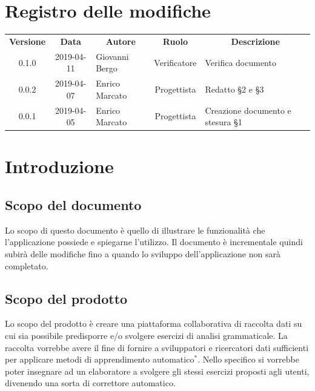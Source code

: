 \documentclass[11pt,a4paper]{article}
\begin{document}
	
	
	{\def\arraystretch{2}\tabcolsep=10pt
	\newpage
	\section*{\centering Registro delle modifiche}
	\begin{tabularx}{\textwidth}{ c | c | p{3.80cm} | c | X }
		\rowcolor{LightBlue}
		\color{white}\bfseries Versione & \color{white}\bfseries Data & \multicolumn{1}{c}{\color{white}\bfseries Autore}
		& \color{white}\bfseries Ruolo & \multicolumn{1}{c}{\color{white}\bfseries Descrizione}\\[0.25cm]
		0.1.0 & 2019-04-11 & Giovanni Bergo & Verificatore & Verifica documento \\ \hline
		0.0.2 & 2019-04-07 & Enrico Marcato & Progettista & Redatto \S2 e \S3 \\ \hline
		0.0.1 & 2019-04-05 & Enrico Marcato & Progettista & Creazione documento e stesura \S1 \\ 
	 \hline		
	\end{tabularx}
	
	\newpage	
	
	\renewcommand  \contentsname {\Large Indice} 
	
	\tableofcontents
	\newpage
	\listoffigures

	\newpage
	
	\section{Introduzione}
	\subsection{Scopo del documento}
	Lo scopo di questo documento è quello di illustrare le funzionalità che l'applicazione possiede e spiegarne l'utilizzo. Il documento è incrementale quindi subirà delle modifiche fino a quando lo sviluppo dell'applicazione non sarà completato.
	\subsection{Scopo del prodotto}
	Lo scopo del prodotto è creare una piattaforma collaborativa di raccolta dati su cui sia possibile predisporre e/o svolgere esercizi di analisi grammaticale. La raccolta vorrebbe avere il fine di fornire a sviluppatori e ricercatori dati sufficienti per applicare metodi di apprendimento automatico$^*$. Nello specifico si vorrebbe poter insegnare ad un elaboratore a svolgere gli stessi esercizi proposti agli utenti, divenendo una sorta di correttore automatico.
	
}
\end{document}
